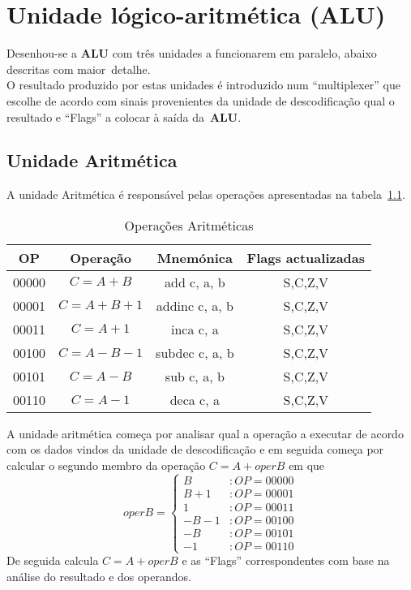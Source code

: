 \documentclass[11pt,a4paper,titlepage,onecolumn]{report}
\begin{document}
	\chapter{Unidade lógico-aritmética (ALU)}
	Desenhou-se a \textbf{ALU} com três unidades a funcionarem em paralelo, abaixo descritas com maior~detalhe.\\
	\quad O resultado produzido por estas unidades é introduzido num ``multiplexer'' que escolhe de acordo com sinais provenientes da unidade de descodificação qual o resultado e ``Flags'' a colocar à saída da~\textbf{ALU}.
	
	\section{Unidade Aritmética}
	A unidade Aritmética é responsável pelas operações apresentadas na tabela~\ref{tabela:arith}.
		
	\begin{table}[h]
		\centering
		\begin{tabular}{|c|c|c|c|}
			\hline
			OP    & Operação & Mnemónica & Flags actualizadas \\ \hline
			00000 & \mbox{$C=A+B$}    & add c, a, b    & S,C,Z,V   \\ \hline
			00001 & \mbox{$C=A+B+1$}  & addinc c, a, b & S,C,Z,V   \\ \hline
			00011 & \mbox{$C=A+1$}    & inca c, a      & S,C,Z,V   \\ \hline
			00100 & \mbox{$C=A-B-1$}  & subdec c, a, b & S,C,Z,V   \\ \hline
			00101 & \mbox{$C=A-B$}    & sub c, a, b    & S,C,Z,V   \\ \hline
			00110 & \mbox{$C=A-1$}    & deca c, a      & S,C,Z,V   \\ \hline
		\end{tabular}
		\caption{Operações Aritméticas}
		\label{tabela:arith}
	\end{table}
	
	A unidade aritmética começa por analisar qual a operação a executar de acordo com os dados vindos da unidade de descodificação e em seguida começa por calcular o segundo membro da operação \mbox{$C=A+operB$} em que 
	\[ operB=\left\{
		\begin{array}{lr}
		B & : OP=00000\\
		B+1 & : OP=00001\\
		1 & : OP=00011\\
		-B-1 & : OP=00100\\
		-B & : OP=00101\\
		-1 & : OP=00110
		\end{array}
		\right.\]
	De seguida calcula \mbox{$C=A+operB$} e as ``Flags'' correspondentes com base na análise do resultado e dos operandos.
	
\end{document}
